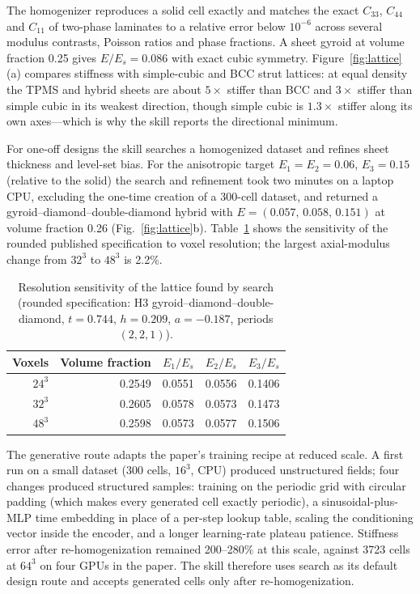 \documentclass[11pt]{article}
\begin{document}
The homogenizer reproduces a solid cell exactly and matches the exact $C_{33}$, $C_{44}$ and
$C_{11}$ of two-phase laminates to a relative error below $10^{-6}$ across several modulus
contrasts, Poisson ratios and phase fractions. A sheet gyroid at volume fraction 0.25 gives
$E/E_s=0.086$ with exact cubic symmetry. Figure~\ref{fig:lattice}(a) compares stiffness with
simple-cubic and BCC strut lattices: at equal density the TPMS and hybrid sheets are about
$5\times$ stiffer than BCC and $3\times$ stiffer than simple cubic in its weakest direction, though
simple cubic is $1.3\times$ stiffer along its own axes---which is why the skill reports the
directional minimum.

For one-off designs the skill searches a homogenized dataset and refines sheet thickness and
level-set bias. For the anisotropic target $E_1=E_2=0.06$, $E_3=0.15$ (relative to the solid) the
search and refinement took two minutes on a laptop CPU, excluding the one-time creation of a
300-cell dataset, and returned a gyroid--diamond--double-diamond hybrid with
$E=(0.057,\,0.058,\,0.151)$ at volume fraction 0.26 (Fig.~\ref{fig:lattice}b).
Table~\ref{tab:lattice-res} shows the sensitivity of the rounded published specification to voxel
resolution; the largest axial-modulus change from $32^3$ to $48^3$ is 2.2\%.

\begin{table}[t]
\centering\small
\caption{Resolution sensitivity of the lattice found by search (rounded specification: H3
gyroid--diamond--double-diamond, $t=0.744$, $h=0.209$, $a=-0.187$, periods $(2,2,1)$).}
\label{tab:lattice-res}
\begin{tabular}{rrrrr}
\toprule
Voxels & Volume fraction & $E_1/E_s$ & $E_2/E_s$ & $E_3/E_s$\\
\midrule
$24^3$ & 0.2549 & 0.0551 & 0.0556 & 0.1406\\
$32^3$ & 0.2605 & 0.0578 & 0.0573 & 0.1473\\
$48^3$ & 0.2598 & 0.0573 & 0.0577 & 0.1506\\
\bottomrule
\end{tabular}
\end{table}

The generative route adapts the paper's training recipe at reduced scale. A first run on a small
dataset (300 cells, $16^3$, CPU) produced unstructured fields; four changes produced structured
samples: training on the periodic grid with circular padding (which makes every generated cell
exactly periodic), a sinusoidal-plus-MLP time embedding in place of a per-step lookup table,
scaling the conditioning vector inside the encoder, and a longer learning-rate plateau patience.
Stiffness error after re-homogenization remained 200--280\% at this scale, against 3723 cells at
$64^3$ on four GPUs in the paper. The skill therefore uses search as its default design route and
accepts generated cells only after re-homogenization.
\end{document}
